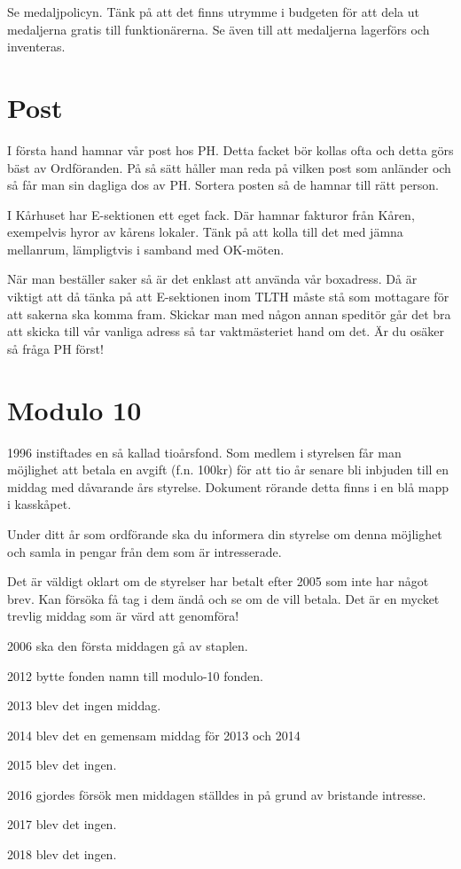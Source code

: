 \documentclass[10pt]{article}
\begin{document}
    Se medaljpolicyn. Tänk på att det finns utrymme i budgeten för att dela ut medaljerna gratis till funktionärerna. Se även till att medaljerna lagerförs och inventeras.
    
    \section{Post}
    
    I första hand hamnar vår post hos PH. Detta facket bör kollas ofta och detta görs bäst av Ordföranden. På så sätt håller man reda på vilken post som anländer och så får man sin dagliga dos av PH. Sortera posten så de hamnar till rätt person.
    
    I Kårhuset har E-sektionen ett eget fack. Där hamnar fakturor från Kåren, exempelvis hyror av kårens lokaler. Tänk på att kolla till det med jämna mellanrum, lämpligtvis i samband med OK-möten.
    
    När man beställer saker så är det enklast att använda vår boxadress. Då är viktigt att då tänka på att E-sektionen inom TLTH måste stå som mottagare för att sakerna ska komma fram. Skickar man med någon annan speditör går det bra att skicka till vår vanliga adress så tar vaktmästeriet hand om det. Är du osäker så fråga PH först!
    
    \section{Modulo 10}
    
    1996 instiftades en så kallad tioårsfond. Som medlem i styrelsen får man möjlighet att betala en avgift (f.n. 100kr) för att tio år senare bli inbjuden till en middag med dåvarande års styrelse. Dokument rörande detta finns i en blå mapp i kasskåpet.
    
    Under ditt år som ordförande ska du informera din styrelse om denna möjlighet och samla in pengar från dem som är intresserade.
    
    Det är väldigt oklart om de styrelser har betalt efter 2005 som inte har något brev. Kan försöka få tag i dem ändå och se om de vill betala. Det är en mycket trevlig middag som är värd att genomföra!
    
    \begin{dashlist}
    \item 2006 ska den första middagen gå av staplen.
    \item 2012 bytte fonden namn till modulo-10 fonden.
    \item 2013 blev det ingen middag.
    \item 2014 blev det en gemensam middag för 2013 och 2014
    \item 2015 blev det ingen.
    \item 2016 gjordes försök men middagen ställdes in på grund av bristande intresse.
    \item 2017 blev det ingen.
    \item 2018 blev det ingen.
    \end{dashlist}
    
\end{document}
